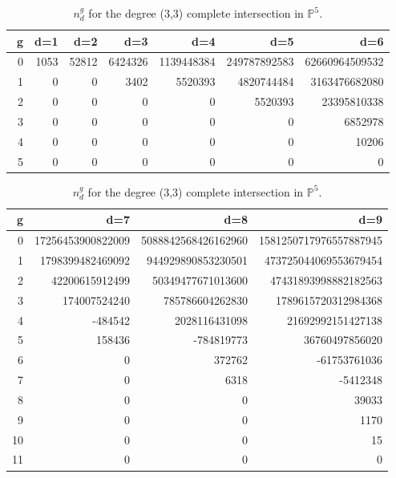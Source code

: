 \documentclass[12pt]{article}
\begin{document}
\begin{table}
\begin{centering}

\begin{tabular}{|r|rrrrrr|}
\hline
g &d=1 &d=2 &d=3 &d=4 &d=5 &d=6 \\
\hline
\, 0& 1053 & 52812 & 6424326  & 1139448384 & 249787892583& 62660964509532\\
1& 0   &  0 & 3402 &5520393  & 4820744484&3163476682080\\
2& 0   &  0 & 0 & 0 &  5520393& 23395810338\\
3& 0   &  0 &  0&  0& 0& 6852978 \\
4& 0   &  0 &  0&  0& 0&  10206\\
5& 0   &  0 &  0&  0& 0&  0 \\
\hline
\end{tabular}
\begin{tabular}{|r|rrr|}
\hline
g &d=7 &d=8 &d=9  \\
\hline
0& 17256453900822009 & 5088842568426162960  & 1581250717976557887945 \\
1&  1798399482469092 &  944929890853230501  &  473725044069553679454 \\
2&   42200615912499  &   50349477671013600  &   47431893998882182563 \\
3&      174007524240 &     785786604262830  &    1789615720312984368 \\
4&          -484542  &       2028116431098  &      21692992151427138\\
5&           158436 &           -784819773  &         36760497856020\\
6&                0 &               372762  &           -61753761036\\
7&                0 &               6318    &             -5412348\\
8&                0 &                0      &                39033\\
9&                0 &                0      &                1170\\
10&               0 &                0      &                 15\\
11      &         0 &                0      &                  0\\
\hline
\end{tabular}
\caption{$n^g_d$ for the degree  (3,3) complete intersection in $\mathbb{P}^5$.}
\end{centering}
\end{table}
\end{document}
